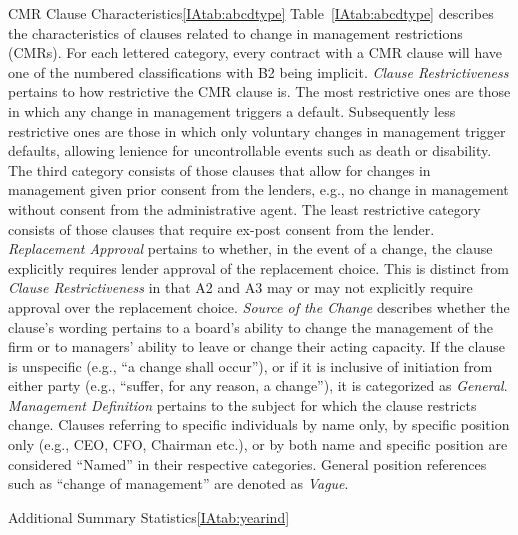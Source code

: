 \documentclass[12pt]{article}
\begin{document}
\begin{appendices}
\begin{singlespace}
\begin{landscapepapertable}{CMR Clause Characteristics}{\ref{IAtab:abcdtype}}{}
    Table~\ref{IAtab:abcdtype} describes the characteristics of clauses related to change in management restrictions (CMRs).
    For each lettered category, every contract with a CMR clause will have one of the numbered classifications with B2 being implicit.
    \textit{Clause Restrictiveness} pertains to how restrictive the CMR clause is.
    The most restrictive ones are those in which any change in management triggers a default.
    Subsequently less restrictive ones are those in which only voluntary changes in management trigger defaults, allowing lenience for uncontrollable events such as death or disability.
    The third category consists of those clauses that allow for changes in management given prior consent from the lenders, e.g., no change in management without consent from the administrative agent.
    The least restrictive category consists of those clauses that require ex-post consent from the lender.
    \textit{Replacement Approval} pertains to whether, in the event of a change, the clause explicitly requires lender approval of the replacement choice.
    This is distinct from \textit{Clause Restrictiveness} in that A2 and A3 may or may not explicitly require approval over the replacement choice.
    \textit{Source of the Change} describes whether the clause's wording pertains to a board's ability to change the management of the firm or to managers' ability to leave or change their acting capacity.
    If the clause is unspecific (e.g., ``a change shall occur''), or if it is inclusive of initiation from either party (e.g., ``suffer, for any reason, a change''), it is categorized as \textit{General}.
    \textit{Management Definition} pertains to the subject for which the clause restricts change.
    Clauses referring to specific individuals by name only, by specific position only (e.g., CEO, CFO, Chairman etc.), or by both name and specific position are considered ``Named'' in their respective categories. General position references such as ``change of management'' are denoted as \textit{Vague}.

    \startdata
    \def\arraystretch{.9}
    
\end{landscapepapertable}






\begin{papertable}{Additional Summary Statistics}{\ref{IAtab:yearind}}{}
    \label{IAtab:yearind}


\end{papertable}
\end{singlespace}
\end{appendices}
\end{document}
